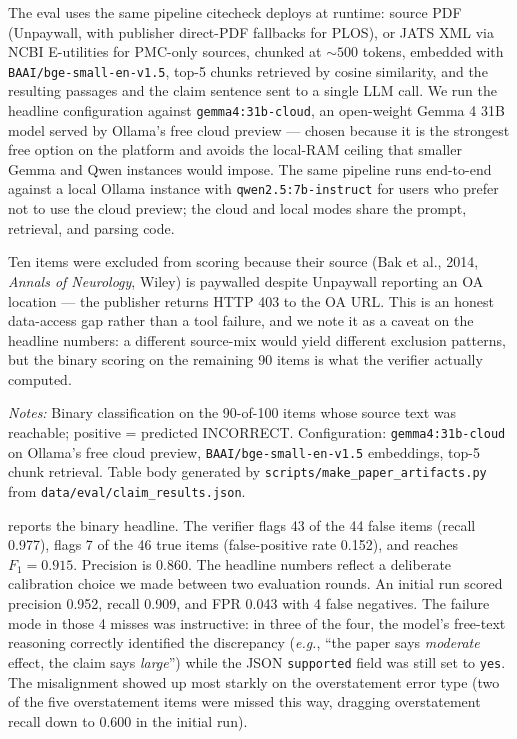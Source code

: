 \documentclass[12pt]{article}
\begin{document}
The eval uses the same pipeline citecheck deploys at runtime: source PDF (Unpaywall, with publisher direct-PDF fallbacks for PLOS), or JATS XML via NCBI E-utilities for PMC-only sources, chunked at ${\sim}500$ tokens, embedded with \texttt{BAAI/bge-small-en-v1.5}, top-5 chunks retrieved by cosine similarity, and the resulting passages and the claim sentence sent to a single LLM call. We run the headline configuration against \texttt{gemma4:31b-cloud}, an open-weight Gemma 4 31B model served by Ollama's free cloud preview --- chosen because it is the strongest free option on the platform and avoids the local-RAM ceiling that smaller Gemma and Qwen instances would impose. The same pipeline runs end-to-end against a local Ollama instance with \texttt{qwen2.5:7b-instruct} for users who prefer not to use the cloud preview; the cloud and local modes share the prompt, retrieval, and parsing code.

Ten items were excluded from scoring because their source (Bak et al., 2014, \textit{Annals of Neurology}, Wiley) is paywalled despite Unpaywall reporting an OA location --- the publisher returns HTTP 403 to the OA URL. This is an honest data-access gap rather than a tool failure, and we note it as a caveat on the headline numbers: a different source-mix would yield different exclusion patterns, but the binary scoring on the remaining 90 items is what the verifier actually computed.

\begin{table}[htbp]
\centering
\caption{Phase 5 claim-verification check: headline}
\label{tab:eval-claim-headline}
\begin{threeparttable}

\begin{tablenotes}\small
\item \textit{Notes:} Binary classification on the 90-of-100 items whose source text was reachable; positive = predicted INCORRECT. Configuration: \texttt{gemma4:31b-cloud} on Ollama's free cloud preview, \texttt{BAAI/bge-small-en-v1.5} embeddings, top-5 chunk retrieval. Table body generated by \texttt{scripts/make\_paper\_artifacts.py} from \texttt{data/eval/claim\_results.json}.
\end{tablenotes}
\end{threeparttable}
\end{table}

 reports the binary headline. The verifier flags 43 of the 44 false items (recall 0.977), flags 7 of the 46 true items (false-positive rate 0.152), and reaches $F_1 = 0.915$. Precision is 0.860. The headline numbers reflect a deliberate calibration choice we made between two evaluation rounds. An initial run scored precision 0.952, recall 0.909, and FPR 0.043 with 4 false negatives. The failure mode in those 4 misses was instructive: in three of the four, the model's free-text reasoning correctly identified the discrepancy (\textit{e.g.}, ``the paper says \textit{moderate} effect, the claim says \textit{large}'') while the JSON \texttt{supported} field was still set to \texttt{yes}. The misalignment showed up most starkly on the overstatement error type (two of the five overstatement items were missed this way, dragging overstatement recall down to 0.600 in the initial run).
\end{document}
